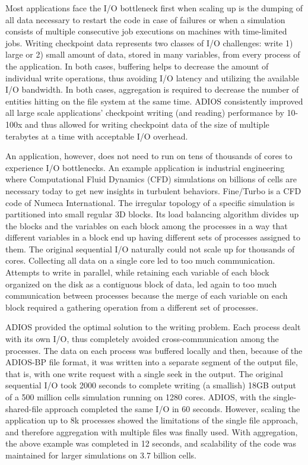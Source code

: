 Most applications face the I/O bottleneck first when scaling up is the dumping of all data necessary to restart the code in case of failures or when a simulation consists of multiple consecutive job executions on machines with time-limited jobs.  Writing checkpoint data represents two classes of I/O challenges: write 1) large or 2) small amount of data, stored in many variables, from every process of the application. In both cases, buffering helps to decrease the amount of individual write operations, thus avoiding I/O latency and utilizing the available I/O bandwidth. In both cases, aggregation is required to decrease the number of entities hitting on the file system at the same time. ADIOS consistently improved all large scale applications' checkpoint writing (and reading) performance by 10-100x and thus allowed for writing checkpoint data of the size of multiple terabytes at a time with acceptable I/O overhead. 

An application, however, does not need to run on tens of thousands of cores to experience I/O bottlenecks. An example application is industrial engineering where Computational Fluid Dynamics (CFD) simulations on billions of cells are necessary today to get new insights in turbulent behaviors. Fine/Turbo is a CFD code of Numeca International. The irregular topology of a specific simulation is partitioned into small regular 3D blocks. Its load balancing algorithm divides up the blocks and the variables on each block among the processes in a way that different variables in a block end up having different sets of processes assigned to them. The original sequential  I/O naturally could not scale up for thousands of cores. Collecting all data on a single core led to too much communication.  Attempts to write in parallel, while retaining each variable of each block organized on the disk as a contiguous block of data, led again to too much communication between processes because the merge of each variable on each block required a gathering operation from a different set of processes. 

ADIOS provided the optimal solution to the writing problem. Each process dealt with its own I/O, thus completely avoided cross-communication among the processes. The data on each process was buffered locally and then, because of the ADIOS-BP file format, it was written into a separate segment of the output file, that is, with one write request with a single seek in the output. The original sequential I/O took 2000 seconds to complete writing (a smallish) 18GB output of a 500 million cells simulation running on 1280 cores. ADIOS, with the single-shared-file approach completed the same I/O in 60 seconds. However, scaling the application up to 8k processes showed the limitations of the single file approach, and therefore aggregation with multiple files was finally used. With aggregation, the above example was completed in 12 seconds, and scalability of the code was maintained for larger simulations on 3.7 billion cells.




